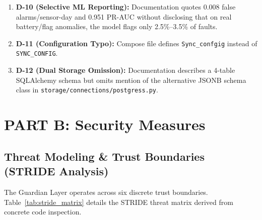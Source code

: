 \documentclass[10pt,a4paper]{report}
\begin{document}
\begin{enumerate}[leftmargin=*]
  \item \textbf{D-10 (Selective ML Reporting):} Documentation quotes 0.008 false alarms/sensor-day and 0.951 PR-AUC without disclosing that on real battery/flag anomalies, the model flags only 2.5\%--3.5\% of faults.
  \item \textbf{D-11 (Configuration Typo):} Compose file defines \texttt{Sync\_confgig} instead of \texttt{SYNC\_CONFIG}.
  \item \textbf{D-12 (Dual Storage Omission):} Documentation describes a 4-table SQLAlchemy schema but omits mention of the alternative JSONB schema class in \texttt{storage/connections/postgress.py}.
\end{enumerate}

\chapter{PART B: Security Measures}

\section{Threat Modeling \& Trust Boundaries (STRIDE Analysis)}
The Guardian Layer operates across six discrete trust boundaries. Table~\ref{tab:stride_matrix} details the STRIDE threat matrix derived from concrete code inspection.
\end{document}
